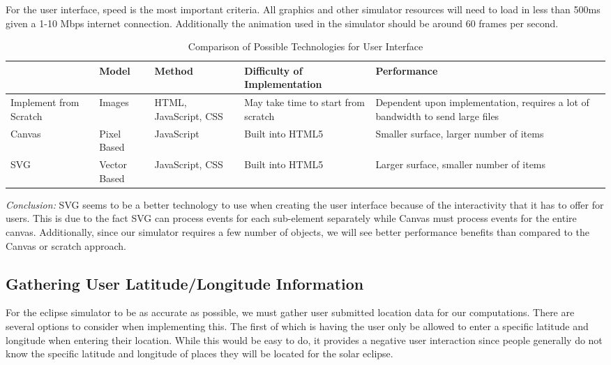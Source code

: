 \documentclass[10pt, onecolumn, draftclsnofoot, letterpaper, compsoc]{IEEEtran}
\begin{document}
For the user interface, speed is the most important criteria. All graphics and
other simulator resources will need to load in less than 500ms given a 1-10
Mbps internet connection. Additionally the animation used in the simulator
should be around 60 frames per second.

\begin{table}[h]
\centering
\caption{Comparison of Possible Technologies for User Interface}
\begin{tabular}{|p{3.15cm}|p{3.15cm}|p{3.15cm}|p{3.15cm}|p{3.15cm}|}
\cline{5-4}

\hline  & Model & Method & Difficulty of Implementation & Performance\\ \hline

Implement from Scratch & Images & HTML, JavaScript, CSS & May take time to
start from scratch & Dependent upon implementation, requires a lot of
bandwidth to send large files \\ \hline

Canvas & Pixel Based & JavaScript & Built into HTML5 & Smaller surface,
larger number of items \\ \hline

SVG & Vector Based & JavaScript, CSS & Built into HTML5 & Larger surface,
smaller number of items \\ \hline

\end{tabular}
\label{table:Jake1}
\end{table}

\textit{Conclusion:} SVG seems to be a better technology to use when creating
the user interface because of the interactivity that it has to offer for users.
This is due to the fact SVG can process events for each sub-element separately
while Canvas must process events for the entire canvas. Additionally, since
our simulator requires a few number of objects, we will see better performance
benefits than compared to the Canvas or scratch approach.

\subsection{Gathering User Latitude/Longitude Information}

For the eclipse simulator to be as accurate as possible, we must gather user
submitted location data for our computations. There are several options to
consider when implementing this. The first of which is having the user only be
allowed to enter a specific latitude and longitude when entering their
location. While this would be easy to do, it provides a negative user
interaction since people generally do not know the specific latitude and
longitude of places they will be located for the solar eclipse.
\end{document}
